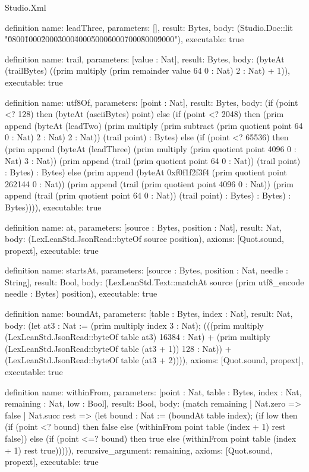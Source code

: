 \begin{lexlean}{Studio.Xml}
\begin{semanticmodule}
definition{
  name: leadThree,
  parameters: [],
  result: Bytes,
  body: (Studio.Doc::lit "\u0800\u1000\u2000\u3000\u4000\u5000\u6000\u7000\u8000\u9000"),
  executable: true
}

definition{
  name: trail,
  parameters: [value : Nat],
  result: Bytes,
  body: (byteAt (trailBytes) ((prim multiply (prim remainder value 64 0 : Nat) 2 : Nat) + 1)),
  executable: true
}

definition{
  name: utf8Of,
  parameters: [point : Nat],
  result: Bytes,
  body: (if (point <? 128) then (byteAt (asciiBytes) point) else (if (point <? 2048) then (prim append (byteAt (leadTwo) (prim multiply (prim subtract (prim quotient point 64 0 : Nat) 2 : Nat) 2 : Nat)) (trail point) : Bytes) else (if (point <? 65536) then (prim append (byteAt (leadThree) (prim multiply (prim quotient point 4096 0 : Nat) 3 : Nat)) (prim append (trail (prim quotient point 64 0 : Nat)) (trail point) : Bytes) : Bytes) else (prim append (byteAt 0xf0f1f2f3f4 (prim quotient point 262144 0 : Nat)) (prim append (trail (prim quotient point 4096 0 : Nat)) (prim append (trail (prim quotient point 64 0 : Nat)) (trail point) : Bytes) : Bytes) : Bytes)))),
  executable: true
}

definition{
  name: at,
  parameters: [source : Bytes, position : Nat],
  result: Nat,
  body: (LexLeanStd.JsonRead::byteOf source position),
  axioms: [Quot.sound, propext],
  executable: true
}

definition{
  name: startsAt,
  parameters: [source : Bytes, position : Nat, needle : String],
  result: Bool,
  body: (LexLeanStd.Text::matchAt source (prim utf8_encode needle : Bytes) position),
  executable: true
}

definition{
  name: boundAt,
  parameters: [table : Bytes, index : Nat],
  result: Nat,
  body: (let at3 : Nat := (prim multiply index 3 : Nat); (((prim multiply (LexLeanStd.JsonRead::byteOf table at3) 16384 : Nat) + (prim multiply (LexLeanStd.JsonRead::byteOf table (at3 + 1)) 128 : Nat)) + (LexLeanStd.JsonRead::byteOf table (at3 + 2)))),
  axioms: [Quot.sound, propext],
  executable: true
}

definition{
  name: withinFrom,
  parameters: [point : Nat, table : Bytes, index : Nat, remaining : Nat, low : Bool],
  result: Bool,
  body: (match remaining
    | Nat.zero => false
    | Nat.succ rest => (let bound : Nat := (boundAt table index); (if low then (if (point <? bound) then false else (withinFrom point table (index + 1) rest false)) else (if (point <=? bound) then true else (withinFrom point table (index + 1) rest true))))),
  recursive_argument: remaining,
  axioms: [Quot.sound, propext],
  executable: true
}


\end{semanticmodule}
\end{lexlean}
